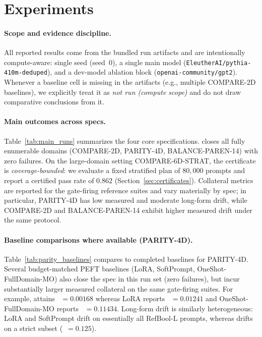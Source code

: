 \section{Experiments}
\label{sec:experiments}

\paragraph{Scope and evidence discipline.}
All reported results come from the bundled run artifacts and are intentionally compute-aware: single seed (seed~0), a single main model (\texttt{EleutherAI/pythia-410m-deduped}), and a dev-model ablation block (\texttt{openai-community/gpt2}).
Whenever a baseline cell is missing in the artifacts (e.g., multiple COMPARE-2D baselines), we explicitly treat it as \emph{not run (compute scope)} and do not draw comparative conclusions from it.

\paragraph{Main outcomes across specs.}
Table~\ref{tab:main_runs} summarizes the four core specifications.
\Method closes all fully enumerable domains (COMPARE-2D, PARITY-4D, BALANCE-PAREN-14) with zero failures.
On the large-domain setting COMPARE-6D-STRAT, the certificate is \emph{coverage-bounded}: we evaluate a fixed stratified plan of $80{,}000$ prompts and report a certified pass rate of $0.862$ (Section~\ref{sec:certificates}).
Collateral metrics are reported for the gate-firing reference suites and vary materially by spec; in particular, PARITY-4D has low measured \KLS and moderate long-form drift, while COMPARE-2D and BALANCE-PAREN-14 exhibit higher measured drift under the same protocol.



\paragraph{Baseline comparisons where available (PARITY-4D).}
Table~\ref{tab:parity_baselines} compares \Method to completed baselines for PARITY-4D.
Several budget-matched PEFT baselines (LoRA, SoftPrompt, OneShot-FullDomain-MO) also close the spec in this run set (zero failures), but incur substantially larger measured collateral on the same gate-firing suites.
For example, \Method attains \KLS\ $=0.00168$ whereas LoRA reports \KLS\ $=0.01241$ and OneShot-FullDomain-MO reports \KLS\ $=0.11434$.
Long-form drift is similarly heterogeneous: LoRA and SoftPrompt drift on essentially all RefBool-L prompts, whereas \Method drifts on a strict subset (\DriftL\ $=0.125$).

